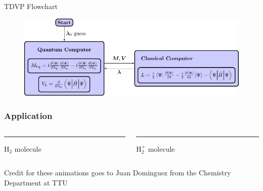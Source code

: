 \documentclass[professionalfonts]{beamer}
\begin{document}


\begin{frame}{TDVP Flowchart}
\begin{figure}[b]
	\centering
	\includegraphics[width=\textwidth]{../img/variation_figure}
\end{figure}
\end{frame}



\begin{frame}
\frametitle{Application}




\begin{columns}[T] %
\begin{column}{.48\textwidth}
\color{black}\rule{\linewidth}{4pt}

$\text{H}_2$ molecule
\end{column}%
\hfill%
\begin{column}{.48\textwidth}
\color{blue}\rule{\linewidth}{4pt}

$\text{H}_2^+$ molecule
\end{column}%
\end{columns}

Credit for these animations goes to Juan Dominguez from the Chemistry Department at TTU
\end{frame}
\end{document}
